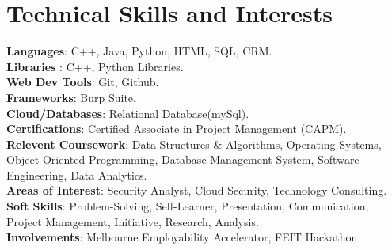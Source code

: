 \documentclass[a4paper,11pt]{article}
\makeatletter
\newcommand{\resumePOR}[3]{
\vspace{0.5mm}\item
    \begin{tabular*}{0.97\textwidth}[t]{l@{\extracolsep{\fill}}r}
        \textbf{#1}\hspace{0.3mm}#2 & \textit{\small{#3}} 
    \end{tabular*}
    \vspace{-2mm}
}
\newcommand{\resumeSubHeadingListStart}{\begin{itemize}[leftmargin=*,labelsep=0mm]}
\newcommand{\resumeSubHeadingListEnd}{\end{itemize}\vspace{2mm}}
\makeatother
\begin{document}
\section{\textbf{Technical Skills and Interests}}
 \begin{itemize}[leftmargin=0.05in, label={}]
    \small{\item{
     \textbf{Languages}{: C++, Java, Python, HTML, SQL, CRM.} \\
     \textbf{Libraries }{: C++, Python Libraries. }\\ 
     \textbf{Web Dev Tools}{: Git, Github. } \\ 
     \textbf{Frameworks}{: Burp Suite.} \\
     \textbf{Cloud/Databases}{: Relational Database(mySql). } \\  
     \textbf{Certifications}{: Certified Associate in Project Management (CAPM).}\\
     \textbf{Relevent Coursework}{: Data Structures \& Algorithms, Operating Systems, Object Oriented Programming, Database Management System, Software Engineering, Data Analytics. } \\ 
     \textbf{Areas of Interest}{: Security Analyst, Cloud Security, Technology Consulting.} \\
     \textbf{Soft Skills}{: Problem-Solving, Self-Learner, Presentation, Communication, Project Management, Initiative, Research, Analysis. } \\
     \textbf{Involvements}{: Melbourne Employability Accelerator, FEIT Hackathon }\\
    }}
 \end{itemize}
 \vspace{-16pt}



    
     
 



\end{document}
